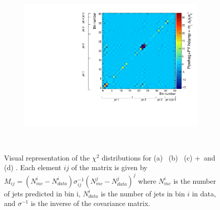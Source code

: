 \begin{figure}
\begin{subfigure}[]{0.45\textwidth}
\end{subfigure}
~
\begin{subfigure}[]{0.45\textwidth}
\includegraphics[width=\textwidth]{fig/DataUnfold/NLOFS/Chi2/110404atlfast.pdf}
\end{subfigure}
~
\caption{Visual representation of the $\chi^2$ distributions for (a) \powpy\ (b) \peight\ (c)  \madgraph +\py\  and (d) \hdamp. Each element $ij$ of the matrix is given by $M_{ij}=(N^{i}_{mc}-N^{i}_{data})\sigma^{-1}_{ij}(N^{j}_{mc}-N^{j}_{data})^{j}$ where $N^{i}_{mc}$ is the number of jets predicted in bin i, $N^{i}_{data}$ is the number of jets in bin $i$ in data, and $\sigma^{-1}$ is the inverse of the covariance matrix.}
\label{fig:chi2}
\end{figure}

